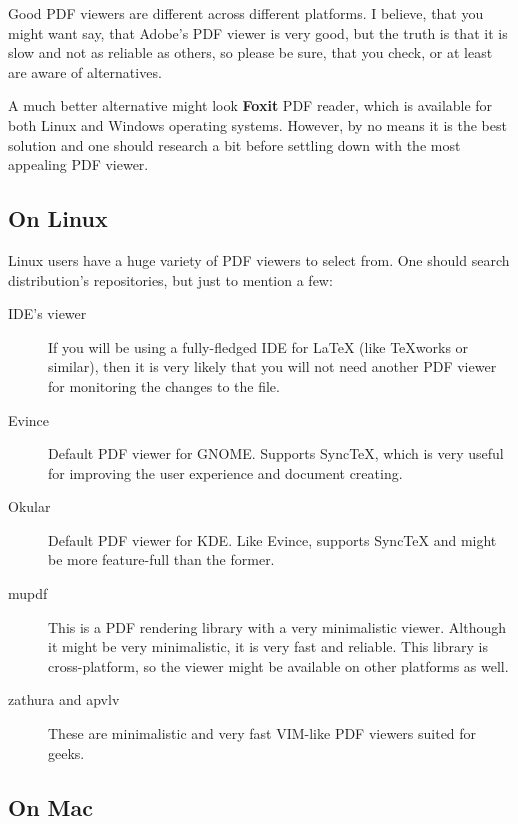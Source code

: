 \documentclass[
    draft
]{scrartcl}
\begin{document}
%
Good PDF viewers are different across different platforms.
%
I believe, that you might want say, that Adobe's PDF viewer is very good, but
    the truth is that it is slow and not as reliable as others, so please be
    sure, that you check, or at least are aware of alternatives.

%
A much better alternative might look \textbf{Foxit} PDF reader, which is
    available for both Linux and Windows operating systems.
%
However, by no means it is the best solution and one should research a bit
    before settling down with the most appealing PDF viewer.

%
\subsection{On Linux}

%
Linux users have a huge variety of PDF viewers to select from.
%
One should search distribution's repositories, but just to mention a few:
\begin{description}
    \item[IDE's viewer]
        If you will be using a fully-fledged IDE for \LaTeX{} (like \TeX{}works
            or similar), then it is very likely that you will not need another
            PDF viewer for monitoring the changes to the  file.
    \item[Evince]
        Default PDF viewer for GNOME.
        Supports Sync\TeX{}, which is very useful for improving the user
            experience and document creating.
    \item[Okular] 
        Default PDF viewer for KDE.
        Like Evince, supports Sync\TeX{} and might be more feature-full than the
            former.
    \item[mupdf]
        This is a PDF rendering library with a very minimalistic viewer.
        Although it might be very minimalistic, it is very fast and reliable.
        This library is cross-platform, so the viewer might be available on
            other platforms as well.
    \item[zathura and apvlv]
        These are minimalistic and very fast VIM-like PDF viewers suited for
            geeks.
\end{description}

%
\subsection{On Mac}
\end{document}
